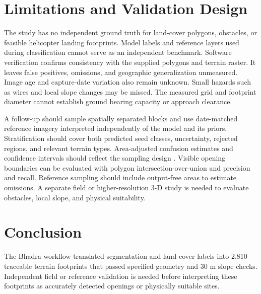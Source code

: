 \documentclass[journal]{IEEEtran}
\begin{document}
\section{Limitations and Validation Design}
The study has no independent ground truth for land-cover polygons, obstacles, or feasible helicopter landing footprints. Model labels and reference layers used during classification cannot serve as an independent benchmark. Software verification confirms consistency with the supplied polygons and terrain raster. It leaves false positives, omissions, and geographic generalization unmeasured. Image age and capture-date variation also remain unknown. Small hazards such as wires and local slope changes may be missed. The measured grid and footprint diameter cannot establish ground bearing capacity or approach clearance.

A follow-up should sample spatially separated blocks and use date-matched reference imagery interpreted independently of the model and its priors. Stratification should cover both predicted seed classes, uncertainty, rejected regions, and relevant terrain types. Area-adjusted confusion estimates and confidence intervals should reflect the sampling design \cite{olofsson}. Visible opening boundaries can be evaluated with polygon intersection-over-union and precision and recall. Reference sampling should include output-free areas to estimate omissions. A separate field or higher-resolution 3-D study is needed to evaluate obstacles, local slope, and physical suitability.

\section{Conclusion}
The Bhadra workflow translated segmentation and land-cover labels into 2,810 traceable terrain footprints that passed specified geometry and 30 m slope checks. Independent field or reference validation is needed before interpreting these footprints as accurately detected openings or physically suitable sites.
\end{document}
